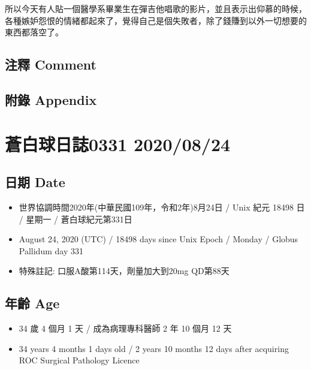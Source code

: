 \documentclass[a5paper, 11pt
]{book}
\providecommand{\tightlist}{%
  \setlength{\itemsep}{0pt}\setlength{\parskip}{0pt}}
\begin{document}
所以今天有人貼一個醫學系畢業生在彈吉他唱歌的影片，並且表示出仰慕的時候，各種嫉妒怨恨的情緒都起來了，覺得自己是個失敗者，除了錢賺到以外一切想要的東西都落空了。

\hypertarget{ux6ce8ux91cb-comment-83}{%
\subsection{注釋 Comment}\label{ux6ce8ux91cb-comment-83}}

\hypertarget{ux9644ux9304-appendix-83}{%
\subsection{附錄 Appendix}\label{ux9644ux9304-appendix-83}}

\hypertarget{ux84bcux767dux7403ux65e5ux8a8c0331-20200824}{%
\section{蒼白球日誌0331
2020/08/24}\label{ux84bcux767dux7403ux65e5ux8a8c0331-20200824}}

\hypertarget{ux65e5ux671f-date-84}{%
\subsection{日期 Date}\label{ux65e5ux671f-date-84}}

\begin{itemize}
\tightlist
\item
  世界協調時間2020年(中華民國109年，令和2年)8月24日 / Unix 紀元 18498 日
  / 星期一 / 蒼白球紀元第331日
\item
  August 24, 2020 (UTC) / 18498 days since Unix Epoch / Monday / Globus
  Pallidum day 331
\item
  特殊註記: 口服A酸第114天，劑量加大到20mg QD第88天
\end{itemize}

\hypertarget{ux5e74ux9f61-age-84}{%
\subsection{年齡 Age}\label{ux5e74ux9f61-age-84}}

\begin{itemize}
\tightlist
\item
  34 歲 4 個月 1 天 / 成為病理專科醫師 2 年 10 個月 12 天
\item
  34 years 4 months 1 days old / 2 years 10 months 12 days after
  acquiring ROC Surgical Pathology Licence
\end{itemize}
\end{document}
